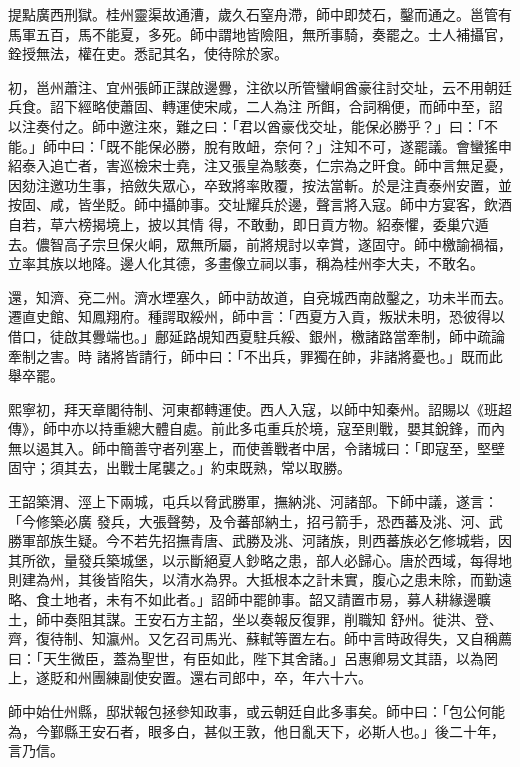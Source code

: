 \begin{pinyinscope}
 提點廣西刑獄。桂州靈渠故通漕，歲久石窒舟滯，師中即焚石，鑿而通之。邕管有馬軍五百，馬不能夏，多死。師中謂地皆險阻，無所事騎，奏罷之。士人補攝官，銓授無法，權在吏。悉記其名，使待除於家。



 初，邕州蕭注、宜州張師正謀啟邊釁，注欲以所管蠻峒酋豪往討交址，云不用朝廷兵食。詔下經略使蕭固、轉運使宋咸，二人為注
 所餌，合詞稱便，而師中至，詔以注奏付之。師中邀注來，難之曰：「君以酋豪伐交址，能保必勝乎？」曰：「不能。」師中曰：「既不能保必勝，脫有敗衄，奈何？」注知不可，遂罷議。會蠻猺申紹泰入追亡者，害巡檢宋士堯，注又張皇為駭奏，仁宗為之旰食。師中言無足憂，因劾注邀功生事，掊斂失眾心，卒致將率敗覆，按法當斬。於是注責泰州安置，並按固、咸，皆坐貶。師中攝帥事。交址耀兵於邊，聲言將入寇。師中方宴客，飲酒自若，草六榜揭境上，披以其情
 得，不敢動，即日貢方物。紹泰懼，委巢穴遁去。儂智高子宗旦保火峒，眾無所屬，前將規討以幸賞，遂固守。師中檄諭禍福，立率其族以地降。邊人化其德，多畫像立祠以事，稱為桂州李大夫，不敢名。



 還，知濟、兗二州。濟水堙塞久，師中訪故道，自兗城西南啟鑿之，功未半而去。遷直史館、知鳳翔府。種諤取綏州，師中言：「西夏方入貢，叛狀未明，恐彼得以借口，徒啟其釁端也。」鄜延路覘知西夏駐兵綏、銀州，檄諸路當牽制，師中疏論牽制之害。時
 諸將皆請行，師中曰：「不出兵，罪獨在帥，非諸將憂也。」既而此舉卒罷。



 熙寧初，拜天章閣待制、河東都轉運使。西人入寇，以師中知秦州。詔賜以《班超傳》，師中亦以持重總大體自處。前此多屯重兵於境，寇至則戰，嬰其銳鋒，而內無以遏其入。師中簡善守者列塞上，而使善戰者中居，令諸城曰：「即寇至，堅壁固守；須其去，出戰士尾襲之。」約束既熟，常以取勝。



 王韶築渭、涇上下兩城，屯兵以脅武勝軍，撫納洮、河諸部。下師中議，遂言：「今修築必廣
 發兵，大張聲勢，及令蕃部納土，招弓箭手，恐西蕃及洮、河、武勝軍部族生疑。今不若先招撫青唐、武勝及洮、河諸族，則西蕃族必乞修城砦，因其所欲，量發兵築城堡，以示斷絕夏人鈔略之患，部人必歸心。唐於西域，每得地則建為州，其後皆陷失，以清水為界。大抵根本之計未實，腹心之患未除，而勤遠略、食土地者，未有不如此者。」詔師中罷帥事。韶又請置市易，募人耕緣邊曠土，師中奏阻其謀。王安石方主韶，坐以奏報反復罪，削職知
 舒州。徙洪、登、齊，復待制、知瀛州。又乞召司馬光、蘇軾等置左右。師中言時政得失，又自稱薦曰：「天生微臣，蓋為聖世，有臣如此，陛下其舍諸。」呂惠卿易文其語，以為罔上，遂貶和州團練副使安置。還右司郎中，卒，年六十六。



 師中始仕州縣，邸狀報包拯參知政事，或云朝廷自此多事矣。師中曰：「包公何能為，今鄞縣王安石者，眼多白，甚似王敦，他日亂天下，必斯人也。」後二十年，言乃信。




\end{pinyinscope}
